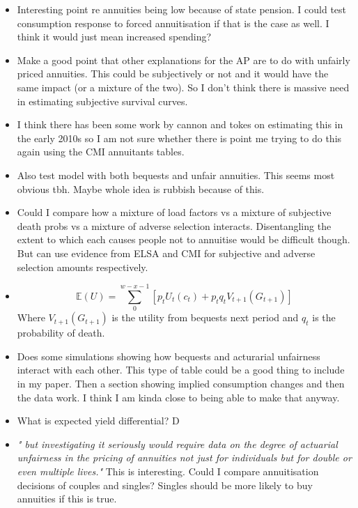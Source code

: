 \documentclass[12pt]{article}
\begin{document}
\begin{itemize}
  \item Interesting point re annuities being low because of state pension.
        I could test consumption response to forced annuitisation if that is the
        case as well. I think it would just mean increased spending?

  \item Make a good point that other explanations for the AP are to do with unfairly priced
        annuities. This could be subjectively or not and it would have the same impact (or
        a mixture of the two). So I don't think there is massive need in estimating subjective
        survival curves.

  \item I think there has been some work by cannon and tokes on estimating this in the
        early 2010s so I am not sure whether there is point me trying to do this again using the
        CMI annuitants tables.

  \item Also test model with both bequests and unfair annuities. This seems most obvious tbh.
        Maybe whole idea is rubbish because of this.

  \item Could I compare how a mixture of load factors vs a mixture of subjective death probs
        vs a mixture of adverse selection interacts. Disentangling the extent to which each causes
        people not to annuitise would be difficult though. But can use evidence from ELSA and CMI for
        subjective and adverse selection amounts respectively.

  \item \begin{equation*}
          \mathbb{E}(U) = \sum_{0}^{w - x - 1}[p_{t}U_{t}(c_{t}) + p_{t}q_{t}V_{t+1}(G_{t+1})]
        \end{equation*}
        Where $V_{t+1}(G_{t+1})$ is the utility from bequests next period and $q_{t}$ is the probability of death.


  \item Does some simulations showing how bequests and acturarial unfairness interact with each other.
        This type of table could be a good thing to include in my paper. Then a section showing implied consumption
        changes and then the data work. I think I am kinda close to being able to make that anyway.

  \item What is expected yield differential? D
  \item \textit{" but investigating it seriously would require data on the
          degree of actuarial unfairness in the pricing of annuities not just for
          individuals but for double or even multiple lives."} This is interesting.
        Could I compare annuitisation decisions of couples and singles? Singles
        should be more likely to buy annuities if this is true.


\end{itemize}
\end{document}
